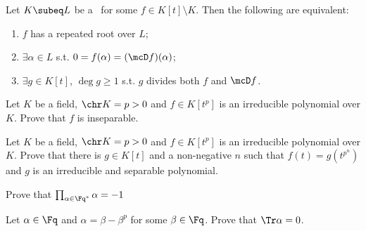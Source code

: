 \documentclass{article}
\begin{document}
\setcounter{section}{8} %
\begin{exercise}
  Let \( K\subeq L \) be a \sfe~for some \( f\in K[t]\setminus K \).
  Then the following are equivalent: \begin{enumerate}[label=(\roman*)]
    \item \( f \) has a repeated root over \( L \);
    \item \( \exists \alpha\in L \) s.t. \( 0=f(\alpha)=(\mcD f)(\alpha) \);
    \item \( \exists g\in K[t] \), \( \deg g \geq 1 \) s.t. \( g \) divides both \( f \) and \( \mcD f \).
  \end{enumerate}
\end{exercise}
\begin{solution}
\end{solution}
\pagebreak

\begin{exercise}
Let \( K \) be a field, \( \chr K = p > 0 \) and \( f\in K[t^p] \) is an irreducible polynomial over \( K \).
Prove that \( f \) is inseparable.
\end{exercise}
\begin{solution}

\end{solution}
\pagebreak

\begin{exercise}
Let \( K \) be a field, \( \chr K = p > 0 \) and \( f\in K[t^p] \) is an irreducible polynomial over \( K \).
Prove that there is \( g\in K[t] \) and a non-negative \( n \) such that \( f(t)=g\left(t^{p^n}\right) \) and \( g \) is  an irreducible and separable polynomial.
\end{exercise}
\begin{solution}

\end{solution}
\pagebreak

\begin{exercise}
  Prove that \( \prod_{\alpha\in \Fq^*} \alpha = -1 \)
\end{exercise}
\begin{solution}

\end{solution}
\pagebreak

\begin{subexercise}
  Let \( \alpha\in\Fq \) and \( \alpha=\beta-\beta^p \) for some \( \beta\in\Fq \).
  Prove that \( \Tr \alpha = 0 \).
\end{subexercise}
\begin{solution}

\end{solution}
\pagebreak
\end{document}
